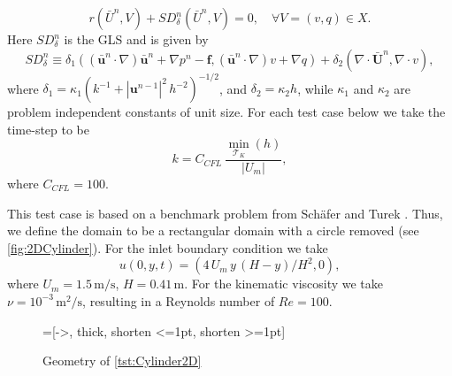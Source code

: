 \begin{equation}
  r(\bar{U}^n,V) + SD_{\delta}^n(\bar{U}^n,V) = 0, \quad \forall V=(v,q) \in X.
  \label{eqn:G2}
\end{equation}
Here $SD_{\delta}^n$ is the GLS and is given by
\begin{equation}
  SD_{\delta}^n \equiv
    \delta_1 (\left(\bar{\mathbf{u}}^n \cdot \nabla \right) \bar{\mathbf{u}}^n
        + \nabla p^n - \mathbf{f},
      \left(\bar{\mathbf{u}}^n \cdot \nabla \right) v + \nabla q)
      + \delta_2 (\nabla \cdot \bar{\mathbf{U}}^n, \nabla \cdot v),
  \label{eqn:NSEStabilization}
\end{equation}
where $\delta_1 = \kappa_1 (k^{-1} + |\mathbf{u}^{n-1}|^2\, h^{-2})^{-1/2}$, and
$\delta_2 = \kappa_2 h$, while $\kappa_1$ and $\kappa_2$ are problem independent
constants of unit size. For each test case below we take the time-step to be
\begin{equation*}
  k = C_{CFL}\, \frac{\min_{\mathcal{T}_K}(h)}{|U_m|},
\end{equation*}
where $C_{CFL}=100$.

\begin{test} \label{tst:Cylinder2D}
  This test case is based on a benchmark problem from Sch\"afer and Turek
  \cite[Test case 2D-2]{Schaefer1996}. Thus, we define the domain to be a
  rectangular domain with a circle removed (see \autoref{fig:2DCylinder}). For
  the inlet boundary condition we take
  \begin{equation}
    u(0,y,t) = (4\, U_m\,y\, (H - y)/H^2, 0),
    \label{eqn:2DInlet}
  \end{equation}
  where $U_m = 1.5\, \text{m/s}$, $H = 0.41\, \text{m}$. For the kinematic
  viscosity we take $\nu = 10^{-3}\, \text{m}^2\text{/s}$, resulting in a
  Reynolds number of $Re=100$.

  \begin{figure}[h]
    \centering
    =[->, thick, shorten <=1pt, shorten >=1pt]
    \caption{Geometry of \autoref{tst:Cylinder2D}}
    \label{fig:2DCylinder}
  \end{figure}
\end{test}


